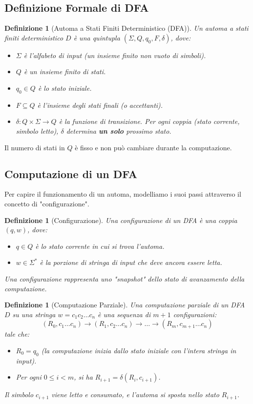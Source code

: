 \documentclass[a4paper, 11pt]{book} %
\newtheorem{definition}[theorem]{Definizione}
\theoremstyle{definition}
\begin{document}
\subsection{Definizione Formale di DFA}
\begin{definition}[Automa a Stati Finiti Deterministico (DFA)]
Un automa a stati finiti deterministico $D$ è una quintupla $( \Sigma, Q, q_0, F, \delta )$, dove:
\begin{itemize}
    \item $\Sigma$ è l'alfabeto di input (un insieme finito non vuoto di simboli).
    \item $Q$ è un insieme finito di stati.
    \item $q_0 \in Q$ è lo stato iniziale.
    \item $F \subseteq Q$ è l'insieme degli stati finali (o accettanti).
    \item $\delta: Q \times \Sigma \to Q$ è la funzione di transizione. Per ogni coppia (stato corrente, simbolo letto), $\delta$ determina \textbf{un solo} prossimo stato.
\end{itemize}
\end{definition}
Il numero di stati in $Q$ è fisso e non può cambiare durante la computazione.

\subsection{Computazione di un DFA}
Per capire il funzionamento di un automa, modelliamo i suoi passi attraverso il concetto di "configurazione".

\begin{definition}[Configurazione]
Una \emph{configurazione} di un DFA è una coppia $(q, w)$, dove:
\begin{itemize}
    \item $q \in Q$ è lo stato corrente in cui si trova l'automa.
    \item $w \in \Sigma^*$ è la porzione di stringa di input che deve ancora essere letta.
\end{itemize}
Una configurazione rappresenta uno "snapshot" dello stato di avanzamento della computazione.
\end{definition}

\begin{definition}[Computazione Parziale]
Una \emph{computazione parziale} di un DFA $D$ su una stringa $w = c_1 c_2 \dots c_n$ è una sequenza di $m+1$ configurazioni:
\[ (R_0, c_1 \dots c_n) \xrightarrow{} (R_1, c_2 \dots c_n) \xrightarrow{} \dots \xrightarrow{} (R_m, c_{m+1} \dots c_n) \]
tale che:
\begin{itemize}
    \item $R_0 = q_0$ (la computazione inizia dallo stato iniziale con l'intera stringa in input).
    \item Per ogni $0 \leq i < m$, si ha $R_{i+1} = \delta(R_i, c_{i+1})$.
\end{itemize}
Il simbolo $c_{i+1}$ viene letto e consumato, e l'automa si sposta nello stato $R_{i+1}$.
\end{definition}
\end{document}
